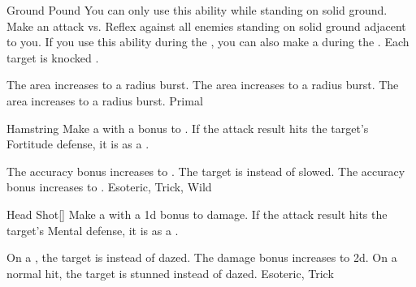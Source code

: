\lowercase{\hypertarget{maneuver:Ground Pound}{}}\label{maneuver:Ground Pound}
\hypertarget{maneuver:Ground Pound}{}
\begin{apability}{Ground Pound}
You can only use this ability while standing on solid ground.
Make an attack vs. Reflex against all enemies standing on solid ground adjacent to you.
If you use this ability during the , you can also make a  during the .
\hit Each target is knocked \prone.

\rankline
{} The area increases to a \areamed radius burst.
 The area increases to a \arealarge radius burst.
 The area increases to a \areahuge radius burst.
 Primal
\end{apability}
\vspace{0.25em}



\lowercase{\hypertarget{maneuver:Hamstring}{}}\label{maneuver:Hamstring}
\hypertarget{maneuver:Hamstring}{}
\begin{apability}{Hamstring}
Make a  with a  bonus to .
If the attack result hits the target's Fortitude defense,
it is  as a .

\rankline
{} The accuracy bonus increases to .
 The target is  instead of slowed.
 The accuracy bonus increases to .
 Esoteric, Trick, Wild
\end{apability}
\vspace{0.25em}



\lowercase{\hypertarget{maneuver:Head Shot}{}}\label{maneuver:Head Shot}
\hypertarget{maneuver:Head Shot}{}
\begin{apability}{Head Shot}[]
Make a  with a \plus1d bonus to damage.
If the attack result hits the target's Mental defense,
it is  as a .

\rankline
{} On a , the target is  instead of dazed.
 The damage bonus increases to \plus2d.
 On a normal hit, the target is stunned instead of dazed.
 Esoteric, Trick
\end{apability}
\vspace{0.25em}



